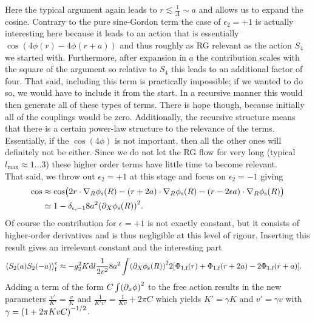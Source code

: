 \documentclass[english, parskip=full]{scrartcl}
\begin{document}
Here the typical argument again leads to $r\lesssim \frac{1}{\Lambda} \sim a$ and allows us to expand the cosine.
Contrary to the pure sine-Gordon term the case of $\epsilon_2=+1$ is actually interesting here because it leads to an action that is essentially $\cos(4\phi(r) - 4\phi(r+a))$ and thus roughly as RG relevant as the action $S_4$ we started with.
Furthermore, after expansion in $a$ the contribution scales with the square of the argument so relative to $S_4$ this leads to an additional factor of four.
That said, including this term is practically impossible; if we wanted to do so, we would have to include it from the start.
In a recursive manner this would then generate all of these types of terms.
There is hope though, because initially all of the couplings would be zero.
Additionally, the recursive structure means that there is a  certain power-law structure to the relevance of the terms.
Essentially, if the $\cos(4\phi)$ is not important, then all the other ones will definitely not be either.
Since we do not let the RG flow for very long (typical $l_\text{max} \approx 1\dots 3$) these higher order terms have little time to become relevant.\\
That said, we throw out $\epsilon_2=+1$ at this stage and focus on $\epsilon_2=-1$ giving
\begin{align}
\cos &\approx \cos\kla[\big]{2 r\cdot \nabla_R\phi_\s(R) - (r+2a) \cdot \nabla_R\phi_\s(R) - (r-2\epsilon a) \cdot \nabla_R\phi_\s(R)}\\
&\simeq 1 - \delta_{\epsilon,-1} 8a^2 \kla*{\partial_X\phi_\s(R)}^2.
\end{align}
Of course the contribution for $\epsilon=+1$ is not exactly constant, but it consists of higher-order derivatives and is thus negligible at this level of rigour.
Inserting this result gives an irrelevant constant and the interesting part
\begin{align}
\bra*{S_2(a) S_2(-a)}_\f^\c &\approx -g_2^2 K \d l \frac{1}{2v^2} 8a^2 \int \kla*{\partial_X\phi_\s(R)}^2 2 \klb*{\Phi_{1,\f}(r) + \Phi_{1,\f}(r+2a) - 2\Phi_{1,\f}(r+ a)}.
\end{align}
Adding a term of the form $C\int \kla*{\partial_x\phi}^2$ to the free action results in the new parameters $\frac{v'}{K'} = \frac{v}{K}$ and $\frac{1}{K'v'} = \frac{1}{Kv} + 2\pi C$ which yields $K'=\gamma K$ and $v'=\gamma v$ with $\gamma = \kla*{1 + 2\pi KvC}^{-1/2}$.
\end{document}
